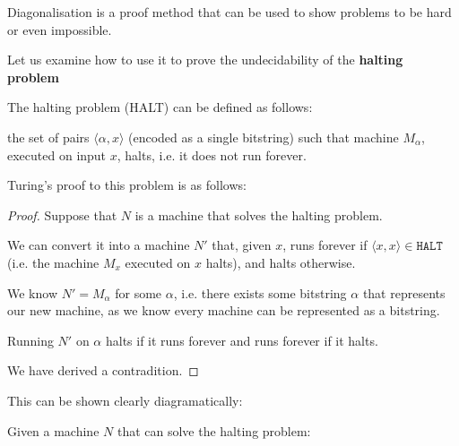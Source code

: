 \documentclass{article}
\begin{document}
      Diagonalisation is a proof method that can be used to show problems to be hard or even impossible.

      Let us examine how to use it to prove the undecidability of the \textbf{halting problem}

      The halting problem (HALT) can be defined as follows:


      \begin{problem}

        the set of pairs $\langle \alpha,x \rangle $ (encoded as a single bitstring) such that machine $M_{\alpha }$, executed on input $x$, halts, i.e. it does not run forever.

      \end{problem}


      Turing's proof to this problem is as follows:

      \begin{proof}
        Suppose that $N$ is a machine that solves the halting problem.

        We can convert it into a machine $N'$ that, given $x$, runs forever if $\langle x,x \rangle \in \texttt{HALT} $ (i.e. the machine $M_{x}$ executed on $x$ halts), and halts otherwise.

        We know $N' = M_{\alpha }$ for some $\alpha $, i.e. there exists some bitstring $\alpha $ that represents our new machine, as we know every machine can be represented as a bitstring.

        Running $N'$ on $\alpha$ halts if it runs forever and runs forever if it halts.

        We have derived a contradition.


      \end{proof}

      This can be shown clearly diagramatically:


      Given a machine $N$ that can solve the halting problem:


      \begin{center}
      \end{center}
\end{document}
